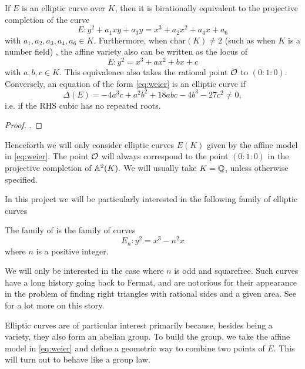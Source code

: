 \documentclass[12pt, a4paper]{report}
\begin{document}
\begin{prop}
  If $E$ is an elliptic curve over $K$, then it is birationally equivalent
  to the projective completion of the curve
  \begin{equation} \label{eq:weier2}
    E: y^2 + a_1xy + a_3y = x^3 + a_2x^2 + a_4x + a_6
  \end{equation}
  with $a_1, a_2, a_3, a_4, a_6 \in K.$
  Furthermore, when $\text{char}(K) \neq 2$ (such as when $K$ is a number field)
  , the affine variety also can be written as the locus of
  \begin{equation} \label{eq:weier}
    E: y^2 = x^3 + ax^2 + bx + c
  \end{equation}
  with $a, b, c\in K$. This equivalence also takes the rational point ${\mathcal O}$ to
  $(0 : 1 : 0)$.
  Conversely, an equation of the form \ref{eq:weier} is an elliptic curve if
  \[\Delta(E) = -4a^3c + a^2b^2 + 18abc - 4b^3 - 27c^2 \neq 0,\]
  i.e. if the RHS cubic has no repeated roots.
\end{prop}

\begin{proof}
  \cite[See][Chapter III, pages 42-43]{arithmetic}.
\end{proof}

Henceforth we will only consider elliptic curves $E(K)$
given by the affine model in \autoref{eq:weier}. The
point ${\mathcal O}$ will always correspond to the point $(0:1:0)$ in the projective
completion of $\mathbb{A}^2(K).$
We will usually take $K = {\mathbb Q}$, unless otherwise specified.

In this project we will be particularly interested in the following family
of elliptic curves

\begin{defn}
  The family of 
  is the family of curves
  \begin{equation} \label{eq:twist}
    E_n : y^2 = x^3 - n^2 x
  \end{equation}
  where $n$ is a positive integer.
\end{defn}

We will only be interested in the case where $n$ is odd and squarefree. Such
curves have a long history going back to Fermat, and are notorious for their
appearance in the problem of finding right triangles with rational sides and a
given area. See \cite{koblitz} for a lot more on this story.

Elliptic curves are of particular interest primarily because, besides being
a variety, they also form an abelian group. To build the group, we take the
affine model in 
\autoref{eq:weier} and define a geometric way to combine two points of $E$. This
will turn out to behave like a group law.
\end{document}

